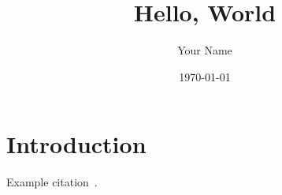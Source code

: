 

\title{Hello, World}
\author{Your Name}
\date{\today{}}



\maketitle

\section{Introduction}

Example citation~\cite{knuth1997art}.





